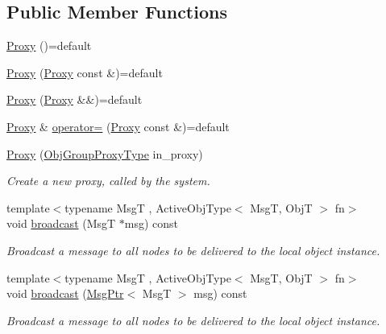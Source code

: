\subsection*{Public Member Functions}
\begin{DoxyCompactItemize}
\item 
\hyperlink{structvt_1_1objgroup_1_1proxy_1_1_proxy_a5450776d9cabb2556765c0d0227c9589}{Proxy} ()=default
\item 
\hyperlink{structvt_1_1objgroup_1_1proxy_1_1_proxy_ad12a9b75a3c4844144d7a159b11af5ec}{Proxy} (\hyperlink{structvt_1_1objgroup_1_1proxy_1_1_proxy}{Proxy} const \&)=default
\item 
\hyperlink{structvt_1_1objgroup_1_1proxy_1_1_proxy_a8711a58bb0444c24553527b6ed9d0cfb}{Proxy} (\hyperlink{structvt_1_1objgroup_1_1proxy_1_1_proxy}{Proxy} \&\&)=default
\item 
\hyperlink{structvt_1_1objgroup_1_1proxy_1_1_proxy}{Proxy} \& \hyperlink{structvt_1_1objgroup_1_1proxy_1_1_proxy_a2fb8dafa11b8c8f70888118bdc2f1b60}{operator=} (\hyperlink{structvt_1_1objgroup_1_1proxy_1_1_proxy}{Proxy} const \&)=default
\item 
\hyperlink{structvt_1_1objgroup_1_1proxy_1_1_proxy_ab76d59446c73ebf1cea9c80fd70fbd6b}{Proxy} (\hyperlink{namespacevt_ad7cae989df485fccca57f0792a880a8e}{Obj\+Group\+Proxy\+Type} in\+\_\+proxy)
\begin{DoxyCompactList}\small\item\em Create a new proxy, called by the system. \end{DoxyCompactList}\item 
{\footnotesize template$<$typename MsgT , Active\+Obj\+Type$<$ Msg\+T, Obj\+T $>$ fn$>$ }\\void \hyperlink{structvt_1_1objgroup_1_1proxy_1_1_proxy_a0b716ca776b1f06e0d7d45afbe9e5274}{broadcast} (MsgT $\ast$msg) const
\begin{DoxyCompactList}\small\item\em Broadcast a message to all nodes to be delivered to the local object instance. \end{DoxyCompactList}\item 
{\footnotesize template$<$typename MsgT , Active\+Obj\+Type$<$ Msg\+T, Obj\+T $>$ fn$>$ }\\void \hyperlink{structvt_1_1objgroup_1_1proxy_1_1_proxy_a7616a82936034b59e1b05c6b033236a2}{broadcast} (\hyperlink{namespacevt_a9f5ebd62ee9d6dd8829e3e1cc4f858e9}{Msg\+Ptr}$<$ MsgT $>$ msg) const
\begin{DoxyCompactList}\small\item\em Broadcast a message to all nodes to be delivered to the local object instance. \end{DoxyCompactList}\item 

\end{DoxyCompactItemize}
